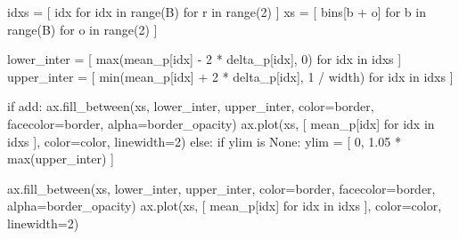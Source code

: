 \documentclass[
  letterpaper,
  DIV=11,
  numbers=noendperiod]{scrartcl}
\newenvironment{Shaded}{\begin{snugshade}}{\end{snugshade}}
\newcommand{\BuiltInTok}[1]{\textcolor[rgb]{0.00,0.23,0.31}{#1}}
\newcommand{\ControlFlowTok}[1]{\textcolor[rgb]{0.00,0.23,0.31}{#1}}
\newcommand{\DecValTok}[1]{\textcolor[rgb]{0.68,0.00,0.00}{#1}}
\newcommand{\FloatTok}[1]{\textcolor[rgb]{0.68,0.00,0.00}{#1}}
\newcommand{\KeywordTok}[1]{\textcolor[rgb]{0.00,0.23,0.31}{#1}}
\newcommand{\NormalTok}[1]{\textcolor[rgb]{0.00,0.23,0.31}{#1}}
\newcommand{\OperatorTok}[1]{\textcolor[rgb]{0.37,0.37,0.37}{#1}}
\newcommand{\VariableTok}[1]{\textcolor[rgb]{0.07,0.07,0.07}{#1}}
\begin{document}
\begin{Shaded}
\begin{Highlighting}[]
\NormalTok{  idxs }\OperatorTok{=}\NormalTok{ [ idx }\ControlFlowTok{for}\NormalTok{ idx }\KeywordTok{in} \BuiltInTok{range}\NormalTok{(B) }\ControlFlowTok{for}\NormalTok{ r }\KeywordTok{in} \BuiltInTok{range}\NormalTok{(}\DecValTok{2}\NormalTok{) ]}
\NormalTok{  xs }\OperatorTok{=}\NormalTok{ [ bins[b }\OperatorTok{+}\NormalTok{ o] }\ControlFlowTok{for}\NormalTok{ b }\KeywordTok{in} \BuiltInTok{range}\NormalTok{(B) }\ControlFlowTok{for}\NormalTok{ o }\KeywordTok{in} \BuiltInTok{range}\NormalTok{(}\DecValTok{2}\NormalTok{) ]}

\NormalTok{  lower\_inter }\OperatorTok{=}\NormalTok{ [ }\BuiltInTok{max}\NormalTok{(mean\_p[idx] }\OperatorTok{{-}} \DecValTok{2} \OperatorTok{*}\NormalTok{ delta\_p[idx], }\DecValTok{0}\NormalTok{)}
                  \ControlFlowTok{for}\NormalTok{ idx }\KeywordTok{in}\NormalTok{ idxs ]}
\NormalTok{  upper\_inter }\OperatorTok{=}\NormalTok{ [ }\BuiltInTok{min}\NormalTok{(mean\_p[idx] }\OperatorTok{+} \DecValTok{2} \OperatorTok{*}\NormalTok{ delta\_p[idx], }\DecValTok{1} \OperatorTok{/}\NormalTok{ width)}
                  \ControlFlowTok{for}\NormalTok{ idx }\KeywordTok{in}\NormalTok{ idxs ]}

  \ControlFlowTok{if}\NormalTok{ add:}
\NormalTok{    ax.fill\_between(xs, lower\_inter, upper\_inter,}
\NormalTok{                    color}\OperatorTok{=}\NormalTok{border, facecolor}\OperatorTok{=}\NormalTok{border,}
\NormalTok{                    alpha}\OperatorTok{=}\NormalTok{border\_opacity)}
\NormalTok{    ax.plot(xs, [ mean\_p[idx] }\ControlFlowTok{for}\NormalTok{ idx }\KeywordTok{in}\NormalTok{ idxs ],}
\NormalTok{            color}\OperatorTok{=}\NormalTok{color, linewidth}\OperatorTok{=}\DecValTok{2}\NormalTok{)}
  \ControlFlowTok{else}\NormalTok{:}
    \ControlFlowTok{if}\NormalTok{ ylim }\KeywordTok{is} \VariableTok{None}\NormalTok{:}
\NormalTok{      ylim }\OperatorTok{=}\NormalTok{ [ }\DecValTok{0}\NormalTok{, }\FloatTok{1.05} \OperatorTok{*} \BuiltInTok{max}\NormalTok{(upper\_inter) ]}

\NormalTok{    ax.fill\_between(xs, lower\_inter, upper\_inter,}
\NormalTok{                    color}\OperatorTok{=}\NormalTok{border, facecolor}\OperatorTok{=}\NormalTok{border,}
\NormalTok{                    alpha}\OperatorTok{=}\NormalTok{border\_opacity)}
\NormalTok{    ax.plot(xs, [ mean\_p[idx] }\ControlFlowTok{for}\NormalTok{ idx }\KeywordTok{in}\NormalTok{ idxs ],}
\NormalTok{            color}\OperatorTok{=}\NormalTok{color, linewidth}\OperatorTok{=}\DecValTok{2}\NormalTok{)}


\end{Highlighting}
\end{Shaded}
\end{document}

